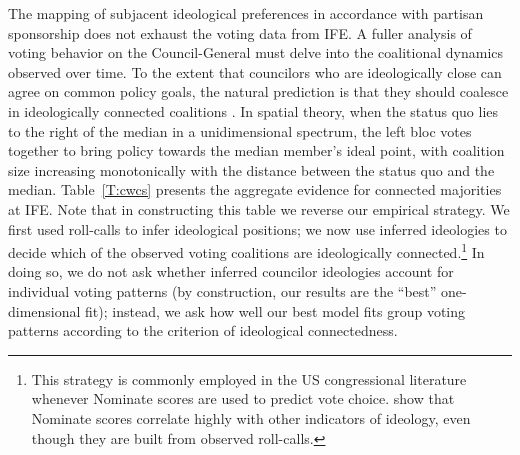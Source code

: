\documentclass[12 pt, letter]{article}
\begin{document}
The mapping of subjacent ideological preferences in accordance with partisan sponsorship does not exhaust the voting data from IFE.  %
A fuller analysis of voting behavior on the Council-General must delve into the coalitional dynamics observed over time.  To the extent that councilors who are ideologically close can agree on common policy goals, the natural prediction is that they should coalesce in ideologically connected coalitions \citep{Axelrod1970}.  In spatial theory, when the status quo lies to the right of the median in a unidimensional spectrum, the left bloc votes together to bring policy towards the median member's ideal point, with coalition size increasing monotonically with the distance between the status quo and the median.  Table~\ref{T:cwcs} presents the aggregate evidence for connected majorities at IFE.  Note that in constructing this table we reverse our empirical strategy.  We first used roll-calls to infer ideological positions; we now use inferred ideologies to decide which of the observed voting coalitions are ideologically connected.\footnote{This strategy is commonly employed in the US congressional literature whenever {\sc Nominate} scores are used to predict vote choice.  \citet{Burden2000} show that {\sc Nominate} scores correlate highly with other indicators of ideology, even though they are built from observed roll-calls.}  In doing so, we do not ask whether inferred councilor ideologies account for individual voting patterns (by construction, our results are the ``best'' one-dimensional fit); instead, we ask how well our best model fits group voting patterns according to the criterion of ideological connectedness.
\end{document}
